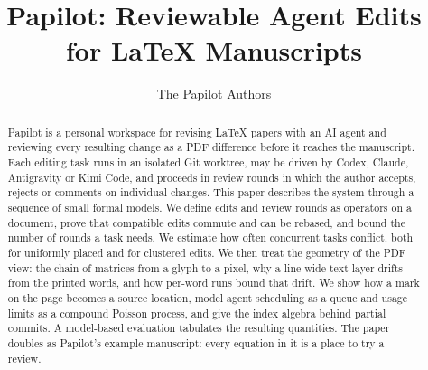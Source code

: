 \documentclass[11pt]{article}
\title{Papilot: Reviewable Agent Edits for \LaTeX{} Manuscripts}
\author{The Papilot Authors}
\date{}
\begin{document}
\maketitle

\begin{abstract}
Papilot is a personal workspace for revising \LaTeX{} papers with an AI agent
and reviewing every resulting change as a PDF difference before it reaches the
manuscript. Each editing task runs in an isolated Git worktree, may be driven
by Codex, Claude, Antigravity or Kimi Code, and proceeds in review rounds in which the
author accepts, rejects or comments on individual changes. This paper describes
the system through a sequence of small formal models. We define edits and
review rounds as operators on a document, prove that compatible edits commute
and can be rebased, and bound the number of rounds a task needs. We estimate
how often concurrent tasks conflict, both for uniformly placed and for
clustered edits. We then treat the geometry of the PDF view: the chain of
matrices from a glyph to a pixel, why a line-wide text layer drifts from the
printed words, and how per-word runs bound that drift. We show how a mark on
the page becomes a source location, model agent scheduling as a queue and
usage limits as a compound Poisson process, and give the index algebra behind
partial commits. A model-based evaluation tabulates the resulting quantities.
The paper doubles as Papilot's example manuscript: every equation in it is a
place to try a review.
\end{abstract}

\tableofcontents
\clearpage

















\appendix





\end{document}
